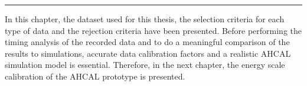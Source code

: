 \begin{center}
  \rule{0.5\textwidth}{.4pt}
\end{center}

In this chapter, the dataset used for this thesis, the selection criteria for each type of data and the rejection criteria have been presented. Before performing the timing analysis of the recorded data and to do a meaningful comparison of the results to simulations, accurate data calibration factors and a realistic AHCAL simulation model is essential. Therefore, in the next chapter, the energy scale calibration of the AHCAL prototype is presented.
